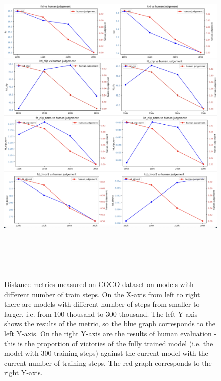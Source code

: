 \begin{figure}[]
\centering
\includegraphics[width=16cm, height=17cm]{figs/coco_train_steps.png}
\caption{Distance metrics measured on COCO dataset on models with different number of train steps. On the X-axis from left to right there are models with different number of steps from smaller to larger, i.e. from 100 thousand to 300 thousand. The left Y-axis shows the results of the metric, so the blue graph corresponds to the left Y-axis. On the right Y-axis are the results of human evaluation - this is the proportion of victories of the fully trained model (i.e. the model with 300 training steps) against the current model with the current number of training steps. The red graph corresponds to the right Y-axis.}
\label{fig:coco_train_steps}
\end{figure}

